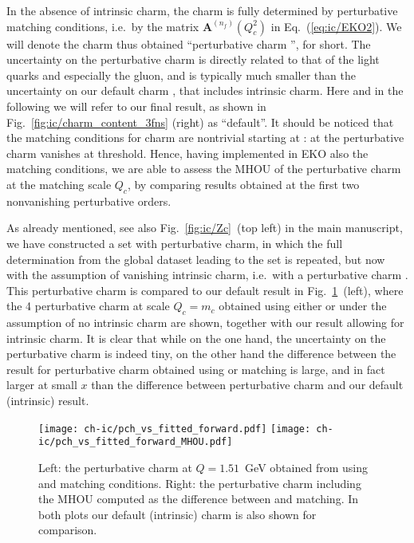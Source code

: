 
In the absence of intrinsic charm, the charm \pdf is fully determined by
perturbative matching conditions, i.e.\ by the matrix
$\mathbf{A}^{(n_f)}(Q_{c}^2)$ in Eq.~(\ref{eq:ic/EKO2}).
%
We will denote the
charm \pdf thus obtained
``perturbative charm \pdf'', for short. The \pdf
uncertainty on the perturbative charm \pdf is directly related to that 
of the light quarks and especially the gluon, and is typically much smaller
than  the  uncertainty on our default charm \pdf, that includes
intrinsic charm. Here and in the following we will refer to our final
result, as shown in Fig.~\ref{fig:ic/charm_content_3fns} (right) as ``default''.
%
It should be noticed that the matching conditions for charm are 
nontrivial starting
at \nnlo: at \nlo the perturbative charm \pdf vanishes at threshold.
%
Hence, having implemented in EKO also the \nnnlo matching conditions,
we are able to assess the MHOU of the perturbative charm at the
matching scale $Q_c$, by comparing
results obtained at the first two nonvanishing perturbative
orders.

As already mentioned, see also Fig.~\ref{fig:ic/Zc}~(top left) in the main manuscript, we have
constructed a \pdf set with perturbative charm, in which the full \pdf
determination from the global dataset leading to the  \pdf set
is repeated, but now with the assumption of vanishing intrinsic charm,
i.e.\ with a perturbative charm \pdf.
%
This perturbative charm \pdf is compared to our default result
in Fig.~\ref{fig:ic/charm_fitted_vs_perturbative_mhous}~(left), where the 4\fns
perturbative 
charm \pdf at scale  $Q_c=m_c$ obtained using either \nnlo or \nnnlo
under the assumption of no intrinsic charm are shown, together with
our  result allowing for intrinsic charm.
%
It is clear that while on the one hand, the \pdf uncertainty on the
perturbative charm \pdf is indeed tiny, on the other
hand the difference between the result for perturbative charm
obtained using \nnlo or \nnnlo matching is large, and in
fact larger at small $x$ than the difference between perturbative charm and our
default (intrinsic) result.

\begin{figure}[h]
  \begin{center}
    \texttt{[image: ch-ic/pch\_vs\_fitted\_forward.pdf]}
    \texttt{[image: ch-ic/pch\_vs\_fitted\_forward\_MHOU.pdf]}
    \caption{\small Left: the perturbative charm \pdf at $Q=1.51$~GeV
  obtained from \nnlo \pdfs using \nnlo and \nnnlo matching
    conditions.
      Right: the \nnlo perturbative charm \pdf including the MHOU
    computed as the difference between \nnlo and \nnnlo matching.
In both plots our default (intrinsic) charm \pdf is also shown for comparison.  
  \label{fig:ic/charm_fitted_vs_perturbative_mhous} }
\end{center}
\end{figure}

